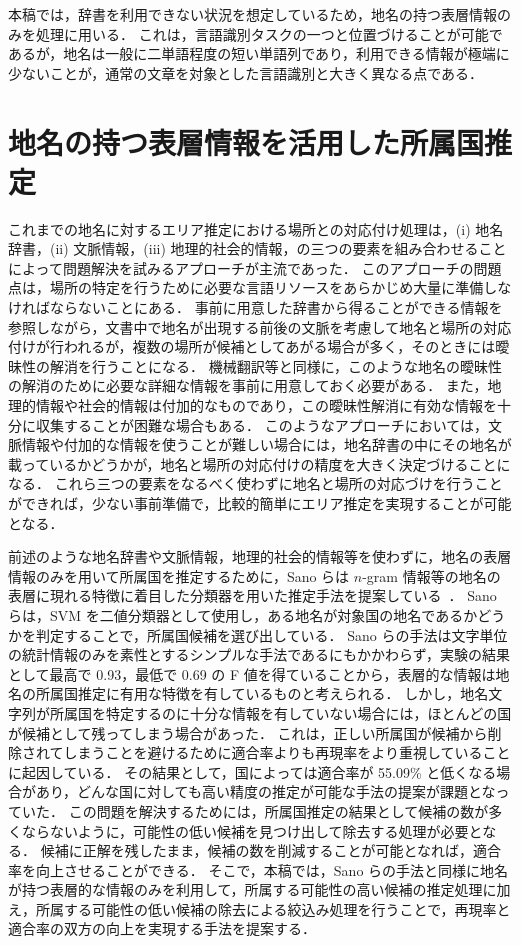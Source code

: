 \documentclass[japanese]{jnlp_1.4}
\begin{document}
本稿では，辞書を利用できない状況を想定しているため，地名の持つ表層情報のみを処理に用いる．
これは，言語識別タスクの一つと位置づけることが可能であるが，地名は一般に二単語程度の短い単語列であり，利用できる情報が極端に少ないことが，通常の文章を対象とした言語識別と大きく異なる点である．


\section{地名の持つ表層情報を活用した所属国推定}
\label{sec:area-identification-with-surface-features}

これまでの地名に対するエリア推定における場所との対応付け処理は，(i) 地名辞書，(ii) 文脈情報，(iii) 地理的社会的情報，の三つの要素を組み合わせることによって問題解決を試みるアプローチが主流であった．
このアプローチの問題点は，場所の特定を行うために必要な言語リソースをあらかじめ大量に準備しなければならないことにある．
事前に用意した辞書から得ることができる情報を参照しながら，文書中で地名が出現する前後の文脈を考慮して地名と場所の対応付けが行われるが，複数の場所が候補としてあがる場合が多く，そのときには曖昧性の解消を行うことになる．
機械翻訳等と同様に，このような地名の曖昧性の解消のために必要な詳細な情報を事前に用意しておく必要がある．
また，地理的情報や社会的情報は付加的なものであり，この曖昧性解消に有効な情報を十分に収集することが困難な場合もある．
このようなアプローチにおいては，文脈情報や付加的な情報を使うことが難しい場合には，地名辞書の中にその地名が載っているかどうかが，地名と場所の対応付けの精度を大きく決定づけることになる．
これら三つの要素をなるべく使わずに地名と場所の対応づけを行うことができれば，少ない事前準備で，比較的簡単にエリア推定を実現することが可能となる．

前述のような地名辞書や文脈情報，地理的社会的情報等を使わずに，地名の表層情報のみを用いて所属国を推定するために，Sano らは $n$-gram 情報等の地名の表層に現れる特徴に着目した分類器を用いた推定手法を提案している~\cite{tomohisa07snlp}．
Sano らは，SVM を二値分類器として使用し，ある地名が対象国の地名であるかどうかを判定することで，所属国候補を選び出している．
Sano らの手法は文字単位の統計情報のみを素性とするシンプルな手法であるにもかかわらず，実験の結果として最高で 0.93，最低で 0.69 の F 値を得ていることから，表層的な情報は地名の所属国推定に有用な特徴を有しているものと考えられる．
しかし，地名文字列が所属国を特定するのに十分な情報を有していない場合には，ほとんどの国が候補として残ってしまう場合があった．
これは，正しい所属国が候補から削除されてしまうことを避けるために適合率よりも再現率をより重視していることに起因している．
その結果として，国によっては適合率が 55.09\% と低くなる場合があり，どんな国に対しても高い精度の推定が可能な手法の提案が課題となっていた．
この問題を解決するためには，所属国推定の結果として候補の数が多くならないように，可能性の低い候補を見つけ出して除去する処理が必要となる．
候補に正解を残したまま，候補の数を削減することが可能となれば，適合率を向上させることができる．
そこで，本稿では，Sano らの手法と同様に地名が持つ表層的な情報のみを利用して，所属する可能性の高い候補の推定処理に加え，所属する可能性の低い候補の除去による絞込み処理を行うことで，再現率と適合率の双方の向上を実現する手法を提案する．
\end{document}
